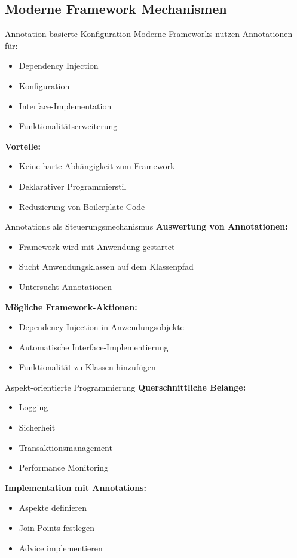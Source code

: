 \subsection{Moderne Framework Mechanismen}

\begin{definition}{Annotation-basierte Konfiguration}
Moderne Frameworks nutzen Annotationen für:
\begin{itemize}
    \item Dependency Injection
    \item Konfiguration
    \item Interface-Implementation
    \item Funktionalitätserweiterung
\end{itemize}

\textbf{Vorteile:}
\begin{itemize}
    \item Keine harte Abhängigkeit zum Framework
    \item Deklarativer Programmierstil
    \item Reduzierung von Boilerplate-Code
\end{itemize}
\end{definition}

\begin{concept}{Annotations als Steuerungsmechanismus}
\textbf{Auswertung von Annotationen:}
\begin{itemize}
    \item Framework wird mit Anwendung gestartet
    \item Sucht Anwendungsklassen auf dem Klassenpfad
    \item Untersucht Annotationen
\end{itemize}

\textbf{Mögliche Framework-Aktionen:}
\begin{itemize}
    \item Dependency Injection in Anwendungsobjekte
    \item Automatische Interface-Implementierung
    \item Funktionalität zu Klassen hinzufügen
\end{itemize}
\end{concept}

\begin{concept}{Aspekt-orientierte Programmierung}
\textbf{Querschnittliche Belange:}
\begin{itemize}
    \item Logging
    \item Sicherheit
    \item Transaktionsmanagement
    \item Performance Monitoring
\end{itemize}

\textbf{Implementation mit Annotations:}
\begin{itemize}
    \item Aspekte definieren
    \item Join Points festlegen
    \item Advice implementieren
\end{itemize}
\end{concept}

